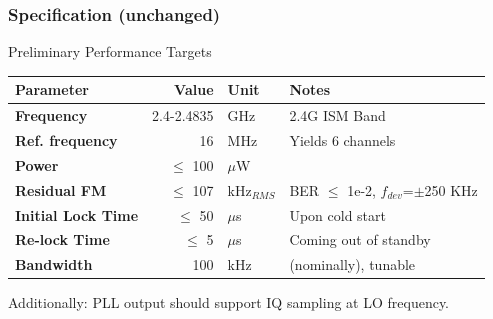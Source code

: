 \documentclass[t, screen, aspectratio=43]{beamer}
\begin{document}
\begin{frame}
	\frametitle{Specification (unchanged)}
	\begin{block}{Preliminary Performance Targets}
		\scriptsize
		\begin{table}[h!]
			\centering
			\def\arraystretch{1.5}		
			\setlength\arrayrulewidth{0.75pt}
			\setlength{\tabcolsep}{1em} %
			\begin{tabular}{|l|r|l|l|}
				\hline 
				\rule[-1ex]{0pt}{2.5ex} \cellcolor{gray!40}\textbf{Parameter} & \cellcolor{gray!40}\textbf{Value} & \cellcolor{gray!40}\textbf{Unit }& \cellcolor{gray!40}\textbf{Notes}\\ 
				\hline 
				\rule[-1ex]{0pt}{2.5ex} \textbf{Frequency}  & 2.4-2.4835 & GHz & 2.4G ISM Band\\ 
				\hline 
				\rule[-1ex]{0pt}{2.5ex} \textbf{Ref. frequency} & 16 & MHz & Yields 6 channels \\ 
				\hline 
				\rule[-1ex]{0pt}{2.5ex} \textbf{Power} & $\leq$ 100  &$\mu$W & \\ 
				\hline 
				\rule[-1ex]{0pt}{2.5ex} \textbf{Residual FM} & $\leq$ 107  &kHz$_{RMS}$ & BER $\leq$ 1e-2, $f_{dev}$=$\pm$250 KHz\\ 
				\hline 
				\rule[-1ex]{0pt}{2.5ex} \textbf{Initial Lock Time} & $\leq$ 50 & $\mu$s & Upon cold start \\ 
				\hline 
				\rule[-1ex]{0pt}{2.5ex} \textbf{Re-lock Time} & $\leq$ 5 & $\mu$s & Coming out of standby \\ 
				\hline 
				\rule[-1ex]{0pt}{2.5ex} \textbf{Bandwidth} & 100 & kHz & (nominally), tunable \\ 
				\hline 
			\end{tabular} 
		\end{table}   
		Additionally: PLL output should support IQ sampling at LO frequency.
	\end{block}    
\end{frame}

\end{document}

